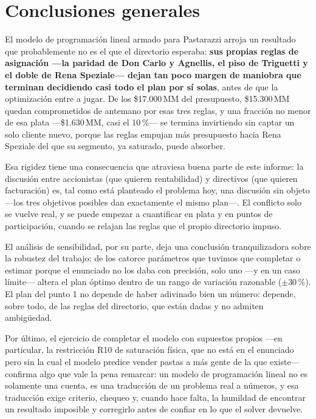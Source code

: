\documentclass[10pt,a4paper]{article}
\begin{document}
\section{Conclusiones generales}

El modelo de programación lineal armado para Pastarazzi arroja un resultado
que probablemente no es el que el directorio esperaba: \textbf{sus propias
reglas de asignación —la paridad de Don Carlo y Agnellis, el piso de
Triguetti y el doble de Rena Speziale— dejan tan poco margen de maniobra que
terminan decidiendo casi todo el plan por sí solas}, antes de que la
optimización entre a jugar. De los \$17.000\,MM del presupuesto, \$15.300\,MM
quedan comprometidos de antemano por esas tres reglas, y una fracción no
menor de esa plata —\$1.630\,MM, casi el 10\,\%— se termina invirtiendo sin
captar un solo cliente nuevo, porque las reglas empujan más presupuesto hacia
Rena Speziale del que su segmento, ya saturado, puede absorber.

Esa rigidez tiene una consecuencia que atraviesa buena parte de este informe:
la discusión entre accionistas (que quieren rentabilidad) y directivos (que
quieren facturación) es, tal como está planteado el problema hoy, una
discusión sin objeto —los tres objetivos posibles dan exactamente el mismo
plan—. El conflicto solo se vuelve real, y se puede empezar a cuantificar en
plata y en puntos de participación, cuando se relajan las reglas que el propio
directorio impuso.

El análisis de sensibilidad, por su parte, deja una conclusión tranquilizadora
sobre la robustez del trabajo: de los catorce parámetros que tuvimos que
completar o estimar porque el enunciado no los daba con precisión, solo uno
—y en un caso límite— altera el plan óptimo dentro de un rango de variación
razonable ($\pm30\,\%$). El plan del punto 1 no depende de haber adivinado
bien un número: depende, sobre todo, de las reglas del directorio, que están
dadas y no admiten ambigüedad.

Por último, el ejercicio de completar el modelo con supuestos propios —en
particular, la restricción R10 de saturación física, que no está en el
enunciado pero sin la cual el modelo predice vender pastas a más gente de la
que existe— confirma algo que vale la pena remarcar: un modelo de
programación lineal no es solamente una cuenta, es una traducción de un
problema real a números, y esa traducción exige criterio, chequeo y, cuando
hace falta, la humildad de encontrar un resultado imposible y corregirlo antes
de confiar en lo que el solver devuelve.
\end{document}
